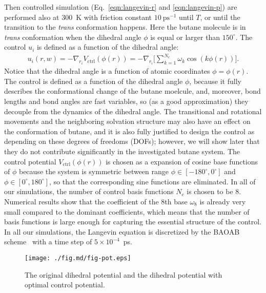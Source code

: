 \documentclass[final]{siamltex}
\begin{document}
Then controlled simulation (Eq.~\eqref{eqn:langevin-r} and
\eqref{eqn:langevin-p}) are performed also at 300~K with friction
constant $10~\textrm{ps}^{-1}$ until $T$, or until the transition to the
\emph{trans} conformation happens. Here the butane molecule is in \emph{trans}
conformation when the dihedral angle $\phi$ is equal or larger than
$150^\circ$. The control  $u_i$ is defined as a function of
the dihedral angle:
\begin{align}
  u_i(r, w) = -\nabla_{r_i}V_{\textrm{ctrl}}(\phi(r))=
  -\nabla_{r_i} \bigg[ \sum_{k=1}^{N_c} \omega_k\cos(k \phi (r)) \bigg].
\end{align}
Notice that the dihedral angle is a function of atomic coordinates
$\phi = \phi(r)$.  The control is defined as a function of the
dihedral angle $\phi$, because it fully describes the conformational
change of the butane moelcule, and, moreover, bond lengths and bond angles
are fast variables, so (as a good approximation) they decouple from
the dynamics of the dihedral angle.  The transitional and rotational
movements and the neighboring solvation structure may also have an effect
on the conformation of butane, and it is also fully justified to
design the control as depending on these degrees of freedoms (DOFs); however, we
will show later that they do not contribute significantly in the
investigated butane system.  The control potential
$V_{\textrm{ctrl}}(\phi(r))$ is chosen as a expansion of cosine base
functions of $\phi$ because the system is symmetric between range $\phi \in
[-180^\circ,0^\circ]$ and $\phi \in [0^\circ, 180^\circ]$, so that the corresponding sine
functions are eliminated. In all of our simulations, the number of control
basis functions $N_c$ is chosen to be 8. Numerical results show that
the coefficient of the 8th base $\omega_8$ is already very small compared
to the dominant coefficients, which means that the number of basis functions is
large enough for  capturing the essential structure of the control.
In all our simulations, the Langevin equation is discretized by the
BAOAB scheme~\cite{leimkuhler2013rational} with a time step of
 $5\times10^{-4}$~ps.

\begin{figure}
  \centering
  \texttt{[image: ./fig.md/fig-pot.eps]}
  \caption{The original dihedral potential and the dihedral potential
    with optimal control potential.}
  \label{fig:tmp2}
\end{figure}
\end{document}
